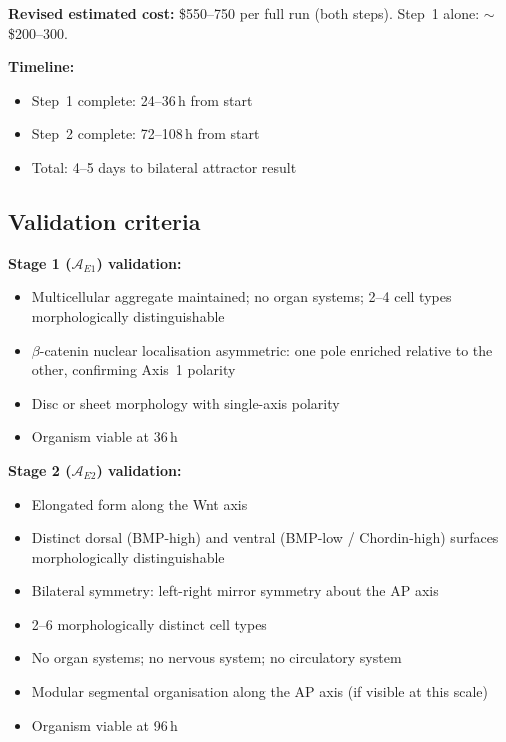 \documentclass[12pt, a4paper]{article}
\theoremstyle{definition}
\theoremstyle{remark}
\begin{document}
\textbf{Revised estimated cost:} \$550--750 per full run
(both steps). Step~1 alone: $\sim$\$200--300.

\textbf{Timeline:}
\begin{itemize}[noitemsep]
  \item Step~1 complete: 24--36\,h from start
  \item Step~2 complete: 72--108\,h from start
  \item Total: 4--5 days to bilateral attractor result
\end{itemize}

\subsection{Validation criteria}

\textbf{Stage 1 ($\mathcal{A}_{E1}$) validation:}
\begin{itemize}[noitemsep]
  \item Multicellular aggregate maintained; no
        organ systems; 2--4 cell types morphologically
        distinguishable
  \item $\beta$-catenin nuclear localisation
        asymmetric: one pole enriched relative to the
        other, confirming Axis~1 polarity
  \item Disc or sheet morphology with single-axis
        polarity
  \item Organism viable at 36\,h
\end{itemize}

\textbf{Stage 2 ($\mathcal{A}_{E2}$) validation:}
\begin{itemize}[noitemsep]
  \item Elongated form along the Wnt axis
  \item Distinct dorsal (BMP-high) and ventral
        (BMP-low / Chordin-high) surfaces
        morphologically distinguishable
  \item Bilateral symmetry: left-right mirror
        symmetry about the AP axis
  \item 2--6 morphologically distinct cell types
  \item No organ systems; no nervous system; no
        circulatory system
  \item Modular segmental organisation along the
        AP axis (if visible at this scale)
  \item Organism viable at 96\,h
\end{itemize}

\end{document}
